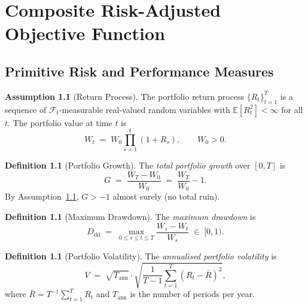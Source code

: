 \documentclass[12pt,openany]{book}
\newcommand{\calF}{\mathcal{F}}
\newcommand{\E}{\mathbb{E}}
\numberwithin{equation}{chapter}
\theoremstyle{plain}
\theoremstyle{definition}
\newtheorem{definition}[theorem]{Definition}
\newtheorem{assumption}[theorem]{Assumption}
\theoremstyle{remark}
\numberwithin{equation}{chapter}
\theoremstyle{plain}
\begin{document}
\chapter{Composite Risk-Adjusted Objective Function}
\label{ch:objective}

\section{Primitive Risk and Performance Measures}

\begin{assumption}[Return Process]
\label{asm:return-process}
\label{asm:market-stationary}
The portfolio return process $\{R_t\}_{t=1}^T$ is a sequence of
$\calF_t$-measurable real-valued random variables with
$\E[R_t^2] < \infty$ for all $t$.  The portfolio value at time $t$ is
\begin{equation}
  W_t \;=\; W_0 \prod_{s=1}^t (1 + R_s), \qquad W_0 > 0.
  \label{eq:wealth-dynamics}
\end{equation}
\end{assumption}

\begin{definition}[Portfolio Growth]
\label{def:growth}
The \emph{total portfolio growth} over $[0,T]$ is
\begin{equation}
  G \;=\; \frac{W_T - W_0}{W_0} \;=\; \frac{W_T}{W_0} - 1.
  \label{eq:growth}
\end{equation}
By Assumption~\ref{asm:return-process}, $G > -1$ almost surely
(no total ruin).
\end{definition}

\begin{definition}[Maximum Drawdown]
\label{def:maxdd-obj}
The \emph{maximum drawdown} is
\begin{equation}
  D_{\mathrm{dd}} \;=\; \max_{0 \leq s \leq t \leq T}
  \frac{W_s - W_t}{W_s} \;\in\; [0,1).
  \label{eq:maxdd-obj}
\end{equation}
\end{definition}

\begin{definition}[Portfolio Volatility]
\label{def:volatility-obj}
The \emph{annualised portfolio volatility} is
\begin{equation}
  V \;=\; \sqrt{T_{\mathrm{ann}}} \cdot
  \sqrt{\frac{1}{T-1}\sum_{t=1}^T (R_t - \bar{R})^2},
  \label{eq:volatility}
\end{equation}
where $\bar{R} = T^{-1}\sum_{t=1}^T R_t$ and $T_{\mathrm{ann}}$
is the number of periods per year.
\end{definition}
\end{document}
